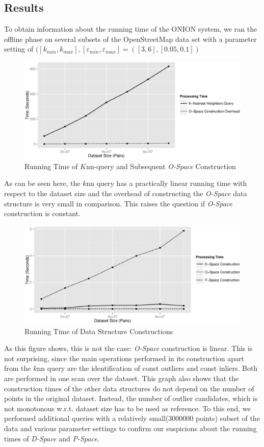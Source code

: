 \documentclass[runningheads]{llncs}
\begin{document}
\subsection{Results}
To obtain information about the running time of the ONION system, we ran the offline phase on several subsets of the OpenStreetMap data set with a parameter setting of $([k_{min},k_{max}],[\varepsilon_{min},\varepsilon_{max}] = ([3,6],[0.05,0.1])$
\begin{figure}[h]
\caption{Running Time of $K$nn-query and Subsequent \emph{O-Space} Construction}
\includegraphics[width=\textwidth]{images/ospace_vs_knn.eps}
\end{figure}

As can be seen here, the $k$nn query has a practically linear running time with respect to the dataset size and the overhead of constructing the \emph{O-Space} data structure is very small in comparison. This raises the question if \emph{O-Space} construction is constant.


\begin{figure}[H]
\caption{Running Time of Data Structure Constructions}
\includegraphics[width=\textwidth]{images/spaces_construction.eps}
\end{figure}

As this figure shows, this is not the case: \emph{O-Space} construction is linear. This is not surprising, since the main operations performed in its construction apart from the $k$nn query are the identification of const outliers and const inliers. Both are performed in one scan over the dataset.
This graph also shows that the construction times of the other data structures do not depend on the number of points in the original dataset. Instead, the number of outlier candidates, which is not monotonous w.r.t. dataset size has to be used as reference. To this end, we performed additional queries with a relatively small(3000000 points) subset of the data and various parameter settings to confirm our suspicions about the running times of \emph{D-Space} and \emph{P-Space}.
\end{document}
